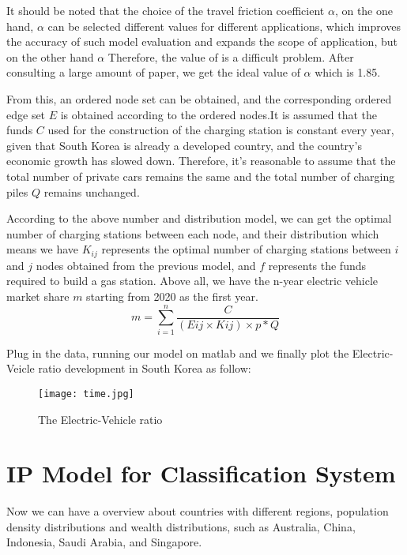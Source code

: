 \documentclass[12pt]{article}  %
\begin{document}
It should be noted that the choice of the travel friction coefficient ${\alpha}$, on the one hand, ${\alpha}$ can be selected different values for different applications, which improves the accuracy of such model evaluation and expands the scope of application, but on the other hand ${\alpha}$ Therefore, the value of is a difficult problem. After consulting a large amount of paper, we get the ideal value of ${\alpha}$ which is 1.85\cite{1}.

From this, an ordered node set can be obtained, and the corresponding ordered edge set ${E}$ is obtained according to the ordered nodes.It is assumed that the funds ${C}$ used for the construction of the charging station is constant every year, given that South Korea is already a developed country, and the country's economic growth has slowed down. Therefore, it's reasonable to assume that the total number of private cars remains the same and the total number of charging piles ${Q}$  remains unchanged. 

According to the above number and distribution model, we can get the optimal number of charging stations between each node, and their distribution which means we have ${K_{ij}}$ represents the optimal number of charging stations between ${i}$ and ${j}$ nodes obtained from the previous model, and ${f}$ represents the funds required to build a gas station. Above all, we have the n-year electric vehicle market share ${m}$ starting from 2020 as the first year.
\begin{equation}
m = \sum\limits_{i = 1}^n {\frac{C}{{(Eij \times Kij) \times p*Q}}}
\end{equation}

Plug in the data, running our model on matlab and we finally plot the Electric-Veicle ratio development in South Korea as follow: 
\begin{figure}[H]
	\centering
	\texttt{[image: time.jpg]}
	\caption{The Electric-Vehicle ratio}\label{fig:11}
\end{figure}

\section{IP Model for Classification System }
Now we can have a overview about countries with different regions, population density distributions and wealth distributions, such as Australia, China, Indonesia, Saudi Arabia, and Singapore.
\end{document}
